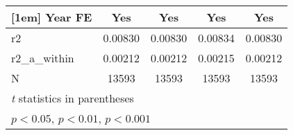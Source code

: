 {\begin{tabular}{l*{4}{c}}
[1em]
Year FE     &         Yes         &         Yes         &         Yes         &         Yes         \\
\hline
r2          &     0.00830         &     0.00830         &     0.00834         &     0.00830         \\
r2\_a\_within &     0.00212         &     0.00212         &     0.00215         &     0.00212         \\
N           &       13593         &       13593         &       13593         &       13593         \\
\hline\hline
\multicolumn{5}{l}{\footnotesize \textit{t} statistics in parentheses}\\
\multicolumn{5}{l}{\footnotesize \sym{*} \(p<0.05\), \sym{**} \(p<0.01\), \sym{***} \(p<0.001\)}\\
\end{tabular}
}
